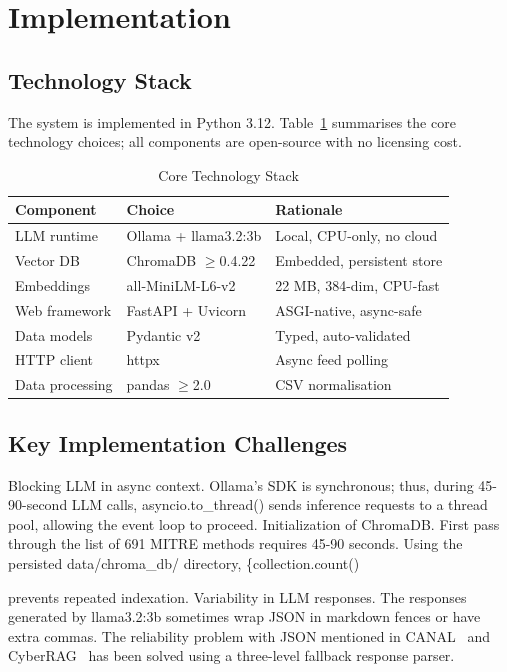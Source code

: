 \documentclass[conference]{IEEEtran}
\begin{document}
{{%
\section{Implementation}
\label{sec:impl}

\subsection{Technology Stack}

The system is implemented in Python 3.12. Table~\ref{tab:stack} summarises
the core technology choices; all components are open-source with no
licensing cost.

\begin{table}[htbp]
\caption{Core Technology Stack}
\label{tab:stack}
\centering
\small
\begin{tabular}{@{}lll@{}}
\toprule
\textbf{Component} & \textbf{Choice} & \textbf{Rationale} \\
\midrule
LLM runtime    & Ollama + llama3.2:3b  & Local, CPU-only, no cloud \\
Vector DB      & ChromaDB $\geq$0.4.22 & Embedded, persistent store \\
Embeddings     & all-MiniLM-L6-v2      & 22 MB, 384-dim, CPU-fast \\
Web framework  & FastAPI + Uvicorn     & ASGI-native, async-safe \\
Data models    & Pydantic v2           & Typed, auto-validated \\
HTTP client    & httpx                 & Async feed polling \\
Data processing& pandas $\geq$2.0      & CSV normalisation \\
\bottomrule
\end{tabular}
\end{table}

\subsection{Key Implementation Challenges}

{Blocking LLM in async context.} Ollama's SDK is synchronous; thus, during 45-90-second LLM calls, {asyncio.to\_thread()} sends inference requests to a thread pool, allowing the event loop to proceed. {Initialization of ChromaDB.} First pass through the list of 691 MITRE methods requires 45-90 seconds. Using the persisted {data/chroma\_db/} directory, \{collection.count()} prevents repeated indexation. {Variability in LLM responses.} The responses generated by llama3.2:3b sometimes wrap JSON in markdown fences or have extra commas. The reliability problem with JSON mentioned in CANAL~\cite{patel2024canal} and CyberRAG~\cite{blefari2026cyberrag} has been solved using a three-level fallback response parser.

}
\end{document}
